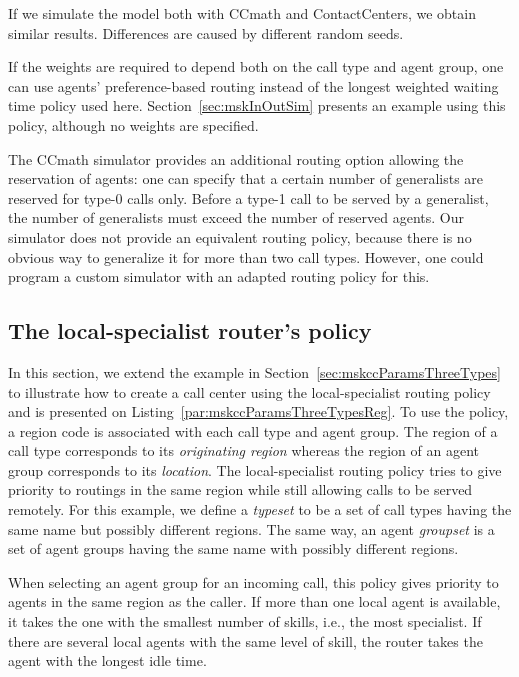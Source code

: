 If we simulate the model both with CCmath and ContactCenters, we
obtain similar results.  Differences are caused by different random
seeds.

If the weights are required to depend both on the call type and agent
group, one can use agents' preference-based routing instead of the
longest weighted waiting time policy used here.
Section~\ref{sec:mskInOutSim} presents an example using this policy,
although no weights are specified.

The CCmath simulator provides an additional routing option allowing
the reservation of agents:  one can specify that a certain number of
generalists are reserved for type-0 calls only.  Before a type-1 call
to be served by a generalist, the number of generalists must exceed
the number of reserved agents.  Our simulator does not provide an
equivalent routing policy, because there is no obvious way to
generalize it for more than two call types.
However, one could program a custom simulator with an adapted routing
policy for this.

\subsection{The local-specialist router's policy}
\label{sec:mskccParamsThreeTypesReg}

In this section, we extend the example in
Section~\ref{sec:mskccParamsThreeTypes} to
illustrate how to create a call center using the
local-specialist routing policy and is presented on
Listing~\ref{par:mskccParamsThreeTypesReg}.
To use the policy,
a region code is associated with each call type and agent group.  The
region of a call type corresponds to its \emph{originating region}
whereas the region of an agent group corresponds to its
\emph{location}.  The local-specialist routing policy tries to give
priority to routings in the same region while still allowing calls to
be served remotely.  For this example, we define a \emph{typeset} to be a
set of call types having the same name but possibly different
regions.  The same way, an agent \emph{groupset} is a set of agent groups
having the same name with possibly different regions.

When selecting an agent group for an incoming call, this policy gives
priority to agents in the same region as the caller.
If more than one local agent is available, it takes the one with the
smallest number of skills, i.e., the most specialist.
If there are several local agents with the same level of skill, the router
takes the agent with the longest idle time.

